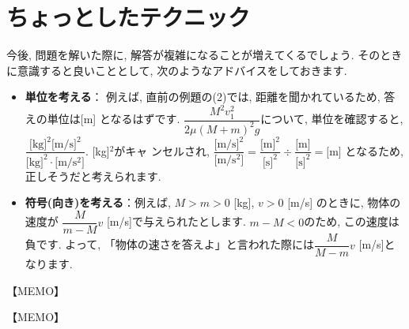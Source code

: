 \documentclass[11pt,dvipdfmx]{jsarticle}
\numberwithin{equation}{section} %
\begin{document}
\section{ちょっとしたテクニック}
今後, 問題を解いた際に, 解答が複雑になることが増えてくるでしょう. そのときに意識すると良いこととして, 次のようなアドバイスをしておきます.
\begin{itemize}
    \item \textbf{単位を考える}：
    例えば, 直前の例題の(2)では, 距離を聞かれているため, 答えの単位は[m] \medbreak
    となるはずです. $\dfrac{M^2v_{1}^2}{2\mu (M+m)^2g}$について, 単位を確認すると, $\dfrac{\text{[kg]}^2\text{[m/s]}^2}{\text{[kg]}^2\cdot \text{[m/s$^2$]}}$. [kg]$^2$がキャ\medbreak
    ンセルされ, $\dfrac{\text{[m/s]}^2}{\text{[m/s$^2$]}} = \dfrac{\text{[m]}^2}{\text{[s]}^2} \div \dfrac{\text{[m]}}{\text{[s]}^2} = \text{[m]}$ となるため, 正しそうだと考えられます.\medskip
    \item \textbf{符号(向き)を考える}：例えば, $M > m > 0$ [kg], $v > 0$ [m/s] のときに, 物体の速度が\medbreak
    $\dfrac{M}{m-M}v$ [m/s]で与えられたとします. $m-M < 0$のため, この速度は負です. よって, \medbreak
    「物体の速さを答えよ」と言われた際には$\dfrac{M}{M-m}v$ [m/s]となります.
\end{itemize}
\begin{center}
【MEMO】
\end{center}
\newpage
\begin{center}
【MEMO】
\end{center}
\end{document}
